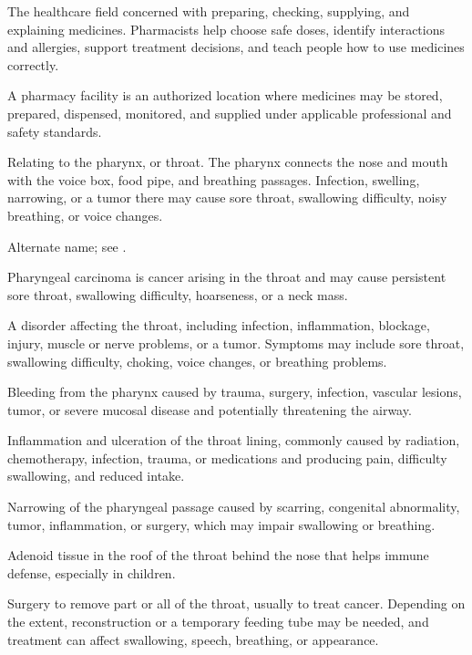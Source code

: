  The healthcare field concerned with preparing, checking, supplying, and explaining medicines. Pharmacists help choose safe doses, identify interactions and allergies, support treatment decisions, and teach people how to use medicines correctly.

 A pharmacy facility is an authorized location where medicines may be stored, prepared, dispensed, monitored, and supplied under applicable professional and safety standards.

 Relating to the pharynx, or throat. The pharynx connects the nose and mouth with the voice box, food pipe, and breathing passages. Infection, swelling, narrowing, or a tumor there may cause sore throat, swallowing difficulty, noisy breathing, or voice changes.

 Alternate name; see .

 Pharyngeal carcinoma is cancer arising in the throat and may cause persistent sore throat, swallowing difficulty, hoarseness, or a neck mass.

 A disorder affecting the throat, including infection, inflammation, blockage, injury, muscle or nerve problems, or a tumor. Symptoms may include sore throat, swallowing difficulty, choking, voice changes, or breathing problems.

 Bleeding from the pharynx caused by trauma, surgery, infection, vascular lesions, tumor, or severe mucosal disease and potentially threatening the airway.

 Inflammation and ulceration of the throat lining, commonly caused by radiation, chemotherapy, infection, trauma, or medications and producing pain, difficulty swallowing, and reduced intake.

 Narrowing of the pharyngeal passage caused by scarring, congenital abnormality, tumor, inflammation, or surgery, which may impair swallowing or breathing.

 Adenoid tissue in the roof of the throat behind the nose that helps immune defense, especially in children.

 Surgery to remove part or all of the throat, usually to treat cancer. Depending on the extent, reconstruction or a temporary feeding tube may be needed, and treatment can affect swallowing, speech, breathing, or appearance.


